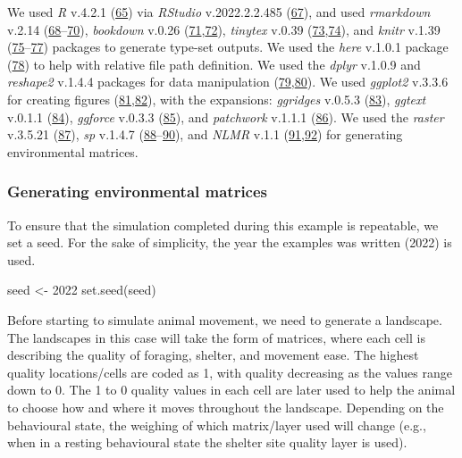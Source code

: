 \documentclass[10pt,a4paper]{article}
\newenvironment{Shaded}{}{}
\newcommand{\DecValTok}[1]{#1}
\newcommand{\FunctionTok}[1]{#1}
\newcommand{\NormalTok}[1]{#1}
\newcommand{\OtherTok}[1]{#1}
\begin{document}
We used \emph{R} v.4.2.1 (\protect\hyperlink{ref-R-base}{65}) via \emph{RStudio} v.2022.2.2.485 (\protect\hyperlink{ref-RStudioTeam2021}{67}), and used \emph{rmarkdown} v.2.14 (\protect\hyperlink{ref-R-rmarkdown}{68}--\protect\hyperlink{ref-rmarkdown2020}{70}), \emph{bookdown} v.0.26 (\protect\hyperlink{ref-bookdown2016}{71},\protect\hyperlink{ref-R-bookdown}{72}), \emph{tinytex} v.0.39 (\protect\hyperlink{ref-tinytex2019}{73},\protect\hyperlink{ref-R-tinytex}{74}), and \emph{knitr} v.1.39 (\protect\hyperlink{ref-knitr2015}{75}--\protect\hyperlink{ref-R-knitr}{77}) packages to generate type-set outputs.
We used the \emph{here} v.1.0.1 package (\protect\hyperlink{ref-R-here}{78}) to help with relative file path definition.
We used the \emph{dplyr} v.1.0.9 and \emph{reshape2} v.1.4.4 packages for data manipulation (\protect\hyperlink{ref-R-dplyr}{79},\protect\hyperlink{ref-reshape22007}{80}).
We used \emph{ggplot2} v.3.3.6 for creating figures (\protect\hyperlink{ref-R-ggplot2}{81},\protect\hyperlink{ref-ggplot22016}{82}), with the expansions: \emph{ggridges} v.0.5.3 (\protect\hyperlink{ref-R-ggridges}{83}), \emph{ggtext} v.0.1.1 (\protect\hyperlink{ref-R-ggtext}{84}), \emph{ggforce} v.0.3.3 (\protect\hyperlink{ref-R-ggforce}{85}), and \emph{patchwork} v.1.1.1 (\protect\hyperlink{ref-R-patchwork}{86}).
We used the \emph{raster} v.3.5.21 (\protect\hyperlink{ref-R-raster}{87}), \emph{sp} v.1.4.7 (\protect\hyperlink{ref-sp2013}{88}--\protect\hyperlink{ref-R-sp}{90}), and \emph{NLMR} v.1.1 (\protect\hyperlink{ref-NLMR2018}{91},\protect\hyperlink{ref-R-NLMR}{92}) for generating environmental matrices.

\hypertarget{generating-environmental-matrices}{%
\subsubsection{Generating environmental matrices}\label{generating-environmental-matrices}}

To ensure that the simulation completed during this example is repeatable, we set a seed.
For the sake of simplicity, the year the examples was written (2022) is used.

\begin{Shaded}
\begin{Highlighting}[]
\NormalTok{seed }\OtherTok{\textless{}{-}} \DecValTok{2022}
\FunctionTok{set.seed}\NormalTok{(seed)}
\end{Highlighting}
\end{Shaded}

Before starting to simulate animal movement, we need to generate a landscape.
The landscapes in this case will take the form of matrices, where each cell is describing the quality of foraging, shelter, and movement ease.
The highest quality locations/cells are coded as 1, with quality decreasing as the values range down to 0.
The 1 to 0 quality values in each cell are later used to help the animal to choose how and where it moves throughout the landscape.
Depending on the behavioural state, the weighing of which matrix/layer used will change (e.g., when in a resting behavioural state the shelter site quality layer is used).
\end{document}

